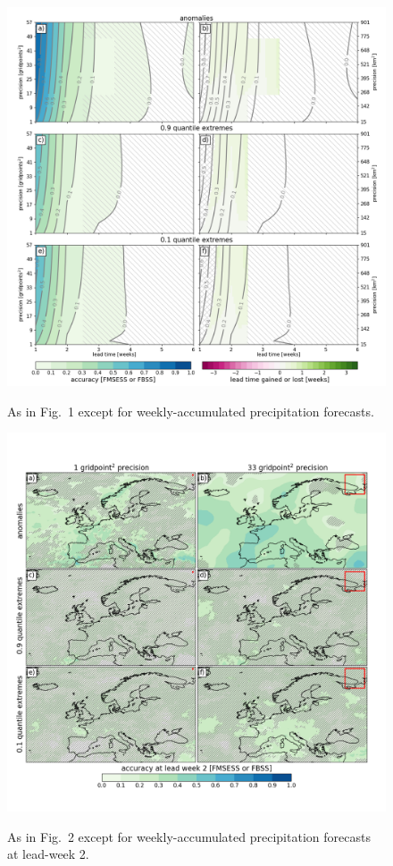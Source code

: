 \documentclass[preprint,12pt,authoryear]{elsarticle}
\begin{document}
\newpage
\begin{figure}[t]
  \noindent\includegraphics[scale=0.45]{fig_03.png}\\
  \caption{As in Fig.~1 except for weekly-accumulated precipitation forecasts.}\label{f3}
\end{figure}

\newpage
\begin{figure}[t]
  \noindent\includegraphics[scale=0.45]{fig_04.png}\\
  \caption{As in Fig.~2 except for weekly-accumulated precipitation forecasts at lead-week 2.}\label{f4}
\end{figure}
\end{document}
